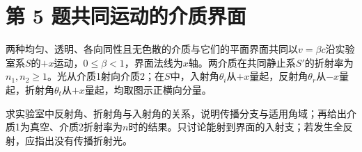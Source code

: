 \documentclass[UTF8,fontset=fandol,a4paper,11pt]{ctexart}
\begin{document}

\section*{第 5 题\quad 共同运动的介质界面}\label{q:5}

两种均匀、透明、各向同性且无色散的介质与它们的平面界面共同以$v=\beta c$沿实验室系$S$的$+x$运动，$0\le\beta<1$，界面法线为$x$轴。两介质在共同静止系$S'$的折射率为$n_1,n_2\ge1$。光从介质1射向介质2；在$S$中，入射角$\theta_i$从$+x$量起，反射角$\theta_r$从$-x$量起，折射角$\theta_t$从$+x$量起，均取图示正横向分量。

求实验室中反射角、折射角与入射角的关系，说明传播分支与适用角域；再给出介质1为真空、介质2折射率为$n$时的结果。只讨论能射到界面的入射支；若发生全反射，应指出没有传播折射光。
\end{document}
